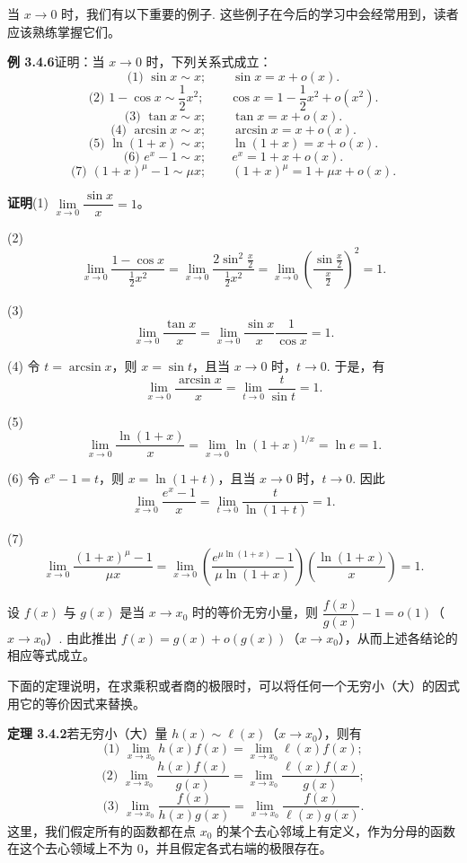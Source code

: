 \documentclass[UTF8,12pt,a4paper,fontset=fandol]{ctexart}
\begin{document}
当 $x\to0$ 时，我们有以下重要的例子. 这些例子在今后的学习中会经常用到，读者应该熟练掌握它们。

\noindent\textbf{例 3.4.6}\quad 证明：当 $x\to0$ 时，下列关系式成立：
\[
  \text{(1) }\sin x\sim x;\qquad \sin x=x+o(x).
\]
\[
  \text{(2) }1-\cos x\sim\frac12x^2;\qquad
  \cos x=1-\frac12x^2+o(x^2).
\]
\[
  \text{(3) }\tan x\sim x;\qquad \tan x=x+o(x).
\]
\[
  \text{(4) }\arcsin x\sim x;\qquad \arcsin x=x+o(x).
\]
\[
  \text{(5) }\ln(1+x)\sim x;\qquad \ln(1+x)=x+o(x).
\]
\[
  \text{(6) }e^x-1\sim x;\qquad e^x=1+x+o(x).
\]
\[
  \text{(7) }(1+x)^\mu-1\sim\mu x;\qquad
  (1+x)^\mu=1+\mu x+o(x).
\]

\noindent\textbf{证明}\quad (1) $\lim\limits_{x\to0}\dfrac{\sin x}{x}=1$。

(2)
\[
  \lim_{x\to0}\frac{1-\cos x}{\frac12x^2}
  =
  \lim_{x\to0}\frac{2\sin^2\frac x2}{\frac12x^2}
  =
  \lim_{x\to0}\left(\frac{\sin\frac x2}{\frac x2}\right)^2
  =
  1.
\]

(3)
\[
  \lim_{x\to0}\frac{\tan x}{x}
  =
  \lim_{x\to0}\frac{\sin x}{x}\frac1{\cos x}
  =
  1.
\]

(4) 令 $t=\arcsin x$，则 $x=\sin t$，且当 $x\to0$ 时，$t\to0$. 于是，有
\[
  \lim_{x\to0}\frac{\arcsin x}{x}
  =
  \lim_{t\to0}\frac t{\sin t}
  =
  1.
\]

(5)
\[
  \lim_{x\to0}\frac{\ln(1+x)}x
  =
  \lim_{x\to0}\ln(1+x)^{1/x}
  =
  \ln e
  =
  1.
\]

(6) 令 $e^x-1=t$，则 $x=\ln(1+t)$，且当 $x\to0$ 时，$t\to0$. 因此
\[
  \lim_{x\to0}\frac{e^x-1}{x}
  =
  \lim_{t\to0}\frac t{\ln(1+t)}
  =
  1.
\]

(7)
\[
  \lim_{x\to0}\frac{(1+x)^\mu-1}{\mu x}
  =
  \lim_{x\to0}
  \left(\frac{e^{\mu\ln(1+x)}-1}{\mu\ln(1+x)}\right)
  \left(\frac{\ln(1+x)}x\right)
  =
  1.
\]

设 $f(x)$ 与 $g(x)$ 是当 $x\to x_0$ 时的等价无穷小量，则 $\dfrac{f(x)}{g(x)}-1=o(1)$（$x\to x_0$）. 由此推出 $f(x)=g(x)+o(g(x))$（$x\to x_0$），从而上述各结论的相应等式成立。

下面的定理说明，在求乘积或者商的极限时，可以将任何一个无穷小（大）的因式用它的等价因式来替换。

\noindent\textbf{定理 3.4.2}\quad 若无穷小（大）量 $h(x)\sim \ell(x)$（$x\to x_0$），则有
\[
  \text{(1) }\lim_{x\to x_0}h(x)f(x)=\lim_{x\to x_0}\ell(x)f(x);
\]
\[
  \text{(2) }\lim_{x\to x_0}\frac{h(x)f(x)}{g(x)}
  =
  \lim_{x\to x_0}\frac{\ell(x)f(x)}{g(x)};
\]
\[
  \text{(3) }\lim_{x\to x_0}\frac{f(x)}{h(x)g(x)}
  =
  \lim_{x\to x_0}\frac{f(x)}{\ell(x)g(x)}.
\]
这里，我们假定所有的函数都在点 $x_0$ 的某个去心邻域上有定义，作为分母的函数在这个去心领域上不为 $0$，并且假定各式右端的极限存在。
\end{document}

